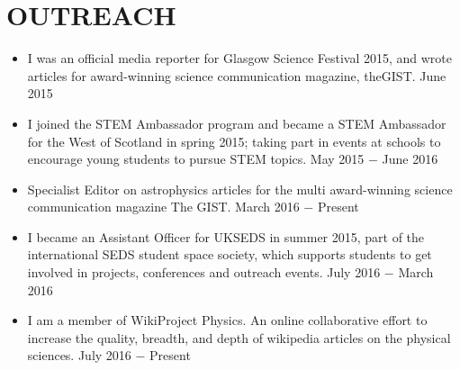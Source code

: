 
\section{OUTREACH}
\begin{itemize}
\item I was an official media reporter for Glasgow Science Festival 2015, and wrote articles for award-winning science communication magazine, theGIST.  \hfill June 2015 \\

\item I joined the STEM Ambassador program and became a STEM Ambassador for the West of Scotland in spring 2015; taking part in events at schools to encourage young students to pursue STEM topics.  \hfill May 2015 $-$ June 2016 \\

\item Specialist Editor on astrophysics articles for the multi award-winning science communication magazine The GIST. \hfill March 2016 $-$ Present \\

\item I became an Assistant Officer for UKSEDS in summer 2015, part of the international SEDS student space society, which supports students to get involved in projects, conferences and outreach events. \hfill July 2016 $-$ March 2016\\

\item I am a member of WikiProject Physics. An online collaborative effort to increase the quality, breadth, and depth of wikipedia articles on the physical sciences. \hfill July 2016 $-$ Present\\

\end{itemize}

